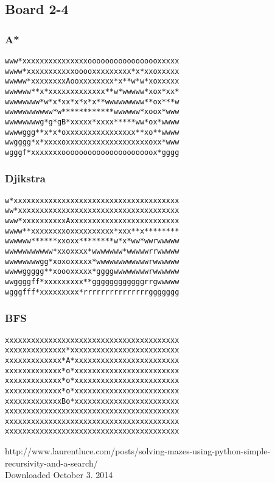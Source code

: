 \documentclass[11pt,a4paper]{article}
\begin{document}
\subsection*{Board 2-4}
\subsubsection*{A*}
\begin{lstlisting}
www*xxxxxxxxxxxxxxxooooooooooooooooxxxxx
wwww*xxxxxxxxxxxooooxxxxxxxxx*x*xxoxxxxx
wwwww*xxxxxxxxAooxxxxxxxx*x**w*w*xoxxxxx
wwwwww**x*xxxxxxxxxxxxx**w*wwwww*xox*xx*
wwwwwwww*w*x*xx*x*x*x**wwwwwwwww**ox***w
wwwwwwwwwww*w************wwwwww*xoox*www
wwwwwwwwg*g*gB*xxxxx*xxxx*****ww*ox*wwww
wwwwggg**x*x*oxxxxxxxxxxxxxxxx**xo**wwww
wwgggg*x*xxxxoxxxxxxxxxxxxxxxxxxxoxx*www
wgggf*xxxxxxxooooooooooooooooooooox*gggg
\end{lstlisting}

\subsubsection*{Djikstra}
\begin{lstlisting}
w*xxxxxxxxxxxxxxxxxxxxxxxxxxxxxxxxxxxxxx
ww*xxxxxxxxxxxxxxxxxxxxxxxxxxxxxxxxxxxxx
www*xxxxxxxxxxAxxxxxxxxxxxxxxxxxxxxxxxxx
wwww**xxxxxxxxoxxxxxxxxxx*xxx**x********
wwwwww******xxoxx********w*x*ww*wwrwwwww
wwwwwwwwwww*xxoxxxx*wwwwwww*wwwwwrrwwwww
wwwwwwwwgg*xoxoxxxxx*wwwwwwwwwwwwrwwwwww
wwwwggggg**xoooxxxxx*ggggwwwwwwwwrwwwwww
wwggggff*xxxxxxxxx**ggggggggggggrrgwwwww
wgggfff*xxxxxxxxx*rrrrrrrrrrrrrrrggggggg
\end{lstlisting}

\subsubsection*{BFS}
\begin{lstlisting}
xxxxxxxxxxxxxxxxxxxxxxxxxxxxxxxxxxxxxxxx
xxxxxxxxxxxxxx*xxxxxxxxxxxxxxxxxxxxxxxxx
xxxxxxxxxxxxx*A*xxxxxxxxxxxxxxxxxxxxxxxx
xxxxxxxxxxxxx*o*xxxxxxxxxxxxxxxxxxxxxxxx
xxxxxxxxxxxxx*o*xxxxxxxxxxxxxxxxxxxxxxxx
xxxxxxxxxxxxx*o*xxxxxxxxxxxxxxxxxxxxxxxx
xxxxxxxxxxxxxBo*xxxxxxxxxxxxxxxxxxxxxxxx
xxxxxxxxxxxxxxxxxxxxxxxxxxxxxxxxxxxxxxxx
xxxxxxxxxxxxxxxxxxxxxxxxxxxxxxxxxxxxxxxx
xxxxxxxxxxxxxxxxxxxxxxxxxxxxxxxxxxxxxxxx
\end{lstlisting}

\begin{thebibliography}{9}

  http://www.laurentluce.com/posts/solving-mazes-using-python-simple-recursivity-and-a-search/
  \\ Downloaded October 3. 2014

\end{thebibliography}
\end{document}
